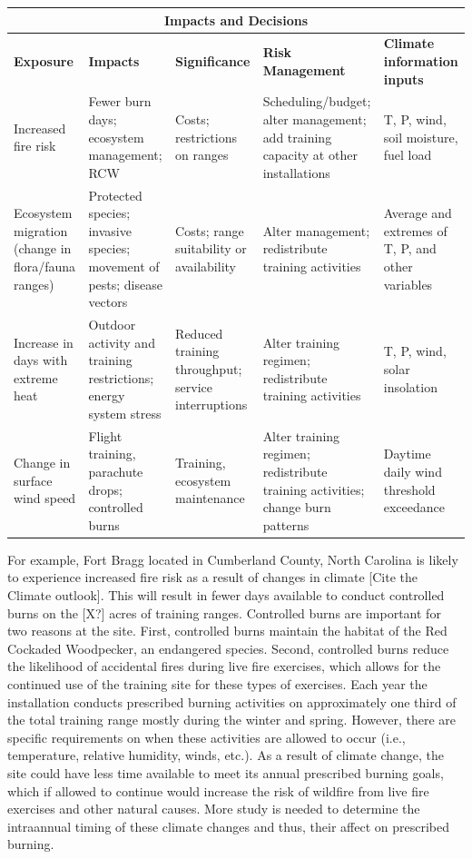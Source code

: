 \documentclass[10pt]{amsart}
\begin{document}
\begin{center}
\label{table:impacts}
\begin{tabular}{ |p{2.5cm}|p{2.5cm}|p{2.5cm}|p{2.5cm}|p{2.5cm}| }
\hline
\multicolumn{5}{|c|}{\textbf{Impacts and Decisions}} \\
\hline
\textbf{Exposure} & \textbf{Impacts} & \textbf{Significance} & \textbf{Risk Management} & \textbf{Climate information inputs} \\
\hline
Increased fire risk & Fewer burn days; ecosystem management; RCW & Costs; restrictions on ranges & Scheduling/budget; alter management; add training capacity at other installations & T, P, wind, soil moisture, fuel load \\
\hline
Ecosystem migration (change in flora/fauna ranges) & Protected species; invasive species; movement of pests; disease vectors & Costs; range suitability or availability & Alter management; redistribute training activities & Average and extremes of T, P, and other variables \\
\hline
Increase in days with extreme heat & Outdoor activity and training restrictions; energy system stress & Reduced training throughput; service interruptions & Alter training regimen; redistribute training activities & T, P, wind, solar insolation \\
\hline
Change in surface wind speed & Flight training, parachute drops; controlled burns & Training, ecosystem maintenance & Alter training regimen; redistribute training activities; change burn patterns & Daytime daily wind threshold exceedance \\
\hline 
\end{tabular}
\end{center}

For example, Fort Bragg located in Cumberland County, North Carolina is likely to experience increased fire risk as a result of changes in climate \parencite{}[Cite the Climate outlook].
This will result in fewer days available to conduct controlled burns on the [X?] acres of training ranges.
Controlled burns are important for two reasons at the site.
First, controlled burns maintain the habitat of the Red Cockaded Woodpecker, an endangered species.
Second, controlled burns reduce the likelihood of accidental fires during live fire exercises, which allows for the continued use of the training site for these types of exercises.
Each year the installation conducts prescribed burning activities on approximately one third of the total training range mostly during the winter and spring.
However, there are specific requirements on when these activities are allowed to occur (i.e., temperature, relative humidity, winds, etc.).
As a result of climate change, the site could have less time available to meet its annual prescribed burning goals, which if allowed to continue would increase the risk of wildfire from live fire exercises and other natural causes.
More study is needed to determine the intraannual timing of these climate changes and thus, their affect on prescribed burning.
\end{document}
